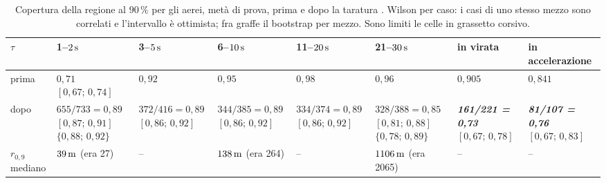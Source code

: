 \begin{table}[H]\centering\footnotesize
\caption{Copertura della regione al $90\,\%$ per gli aerei, metà di prova, prima e dopo la taratura . Wilson per caso: i casi di uno stesso mezzo sono correlati e l'intervallo è ottimista; fra graffe il bootstrap per mezzo. Sono limiti le celle in grassetto corsivo.}\label{tab:vo-taratura}
\setlength{\tabcolsep}{3pt}
\begin{tabularx}{\linewidth}{@{}>{\RaggedRight\arraybackslash}p{2.0cm}LLLLLLL@{}}
\toprule
$\tau$ & 1--$2\,\mathrm{s}$ & 3--$5\,\mathrm{s}$ & 6--$10\,\mathrm{s}$ & 11--$20\,\mathrm{s}$ & 21--$30\,\mathrm{s}$ & in virata & in accelerazione\\
\midrule
prima & $0{,}71$ $[0{,}67;\,0{,}74]$ & $0{,}92$ & $0{,}95$ & $0{,}98$ & $0{,}96$ & $0{,}905$ & $0{,}841$\\
dopo & $655/733=0{,}89$ $[0{,}87;\,0{,}91]$ $\{0{,}88;\,0{,}92\}$ & $372/416=0{,}89$ $[0{,}86;\,0{,}92]$ & $344/385=0{,}89$ $[0{,}86;\,0{,}92]$ & $334/374=0{,}89$ $[0{,}86;\,0{,}92]$ & $328/388=0{,}85$ $[0{,}81;\,0{,}88]$ $\{0{,}78;\,0{,}89\}$ & \textbf{\emph{161/221 = 0,73}} $[0{,}67;\,0{,}78]$ & \textbf{\emph{81/107 = 0,76}} $[0{,}67;\,0{,}83]$\\
$r_{0,9}$ mediano & $39\,\mathrm{m}$ (era 27) & -- & $138\,\mathrm{m}$ (era 264) & -- & $1106\,\mathrm{m}$ (era 2065) & -- & --\\
\bottomrule
\end{tabularx}
\end{table}

